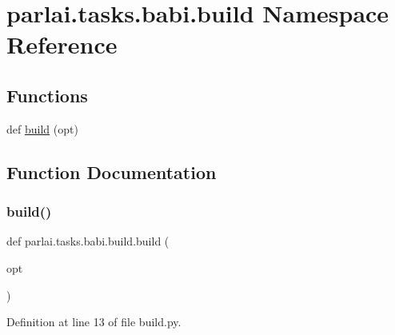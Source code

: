 \hypertarget{namespaceparlai_1_1tasks_1_1babi_1_1build}{}\section{parlai.\+tasks.\+babi.\+build Namespace Reference}
\label{namespaceparlai_1_1tasks_1_1babi_1_1build}
\subsection*{Functions}
\begin{DoxyCompactItemize}
\item 
def \hyperlink{namespaceparlai_1_1tasks_1_1babi_1_1build_a24b76b74415839eb5c7fa1233fbface4}{build} (opt)
\end{DoxyCompactItemize}


\subsection{Function Documentation}
\mbox{\label{namespaceparlai_1_1tasks_1_1babi_1_1build_a24b76b74415839eb5c7fa1233fbface4}} 
\subsubsection{\texorpdfstring{build()}{build()}}
{\footnotesize\ttfamily def parlai.\+tasks.\+babi.\+build.\+build (\begin{DoxyParamCaption}\item[{}]{opt }\end{DoxyParamCaption})}



Definition at line 13 of file build.\+py.


